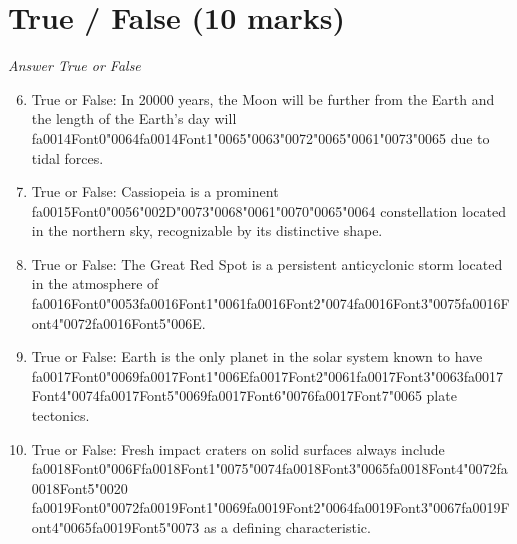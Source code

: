 \documentclass[12pt]{article}
\begin{document}
\section*{True / False (10 marks)}
\textit{Answer True or False}
\begin{enumerate}[label=\arabic*.]
\setcounter{enumi}{5}
\item True or False: In 20000 years, the Moon will be further from the Earth and the length of the Earth's day will {\csname fa0014Font0\endcsname\char"0064}{\csname fa0014Font1\endcsname\char"0065}{\char"0063}{\char"0072}{\char"0065}{\char"0061}{\char"0073}{\char"0065} due to tidal forces.
\item True or False: Cassiopeia is a prominent {\csname fa0015Font0\endcsname\char"0056}{\char"002D}{\char"0073}{\char"0068}{\char"0061}{\char"0070}{\char"0065}{\char"0064} constellation located in the northern sky, recognizable by its distinctive shape.
\item True or False: The Great Red Spot is a persistent anticyclonic storm located in the atmosphere of {\csname fa0016Font0\endcsname\char"0053}{\csname fa0016Font1\endcsname\char"0061}{\csname fa0016Font2\endcsname\char"0074}{\csname fa0016Font3\endcsname\char"0075}{\csname fa0016Font4\endcsname\char"0072}{\csname fa0016Font5\endcsname\char"006E}.
\item True or False: Earth is the only planet in the solar system known to have {\csname fa0017Font0\endcsname\char"0069}{\csname fa0017Font1\endcsname\char"006E}{\csname fa0017Font2\endcsname\char"0061}{\csname fa0017Font3\endcsname\char"0063}{\csname fa0017Font4\endcsname\char"0074}{\csname fa0017Font5\endcsname\char"0069}{\csname fa0017Font6\endcsname\char"0076}{\csname fa0017Font7\endcsname\char"0065} plate tectonics.
\item True or False: Fresh impact craters on solid surfaces always include {\csname fa0018Font0\endcsname\char"006F}{\csname fa0018Font1\endcsname\char"0075}{\char"0074}{\csname fa0018Font3\endcsname\char"0065}{\csname fa0018Font4\endcsname\char"0072}{\csname fa0018Font5\endcsname\char"0020} {\csname fa0019Font0\endcsname\char"0072}{\csname fa0019Font1\endcsname\char"0069}{\csname fa0019Font2\endcsname\char"0064}{\csname fa0019Font3\endcsname\char"0067}{\csname fa0019Font4\endcsname\char"0065}{\csname fa0019Font5\endcsname\char"0073} as a defining characteristic.
\end{enumerate}
\end{document}
